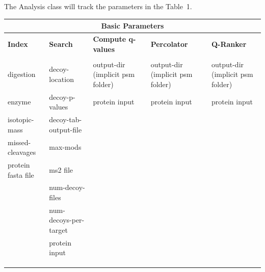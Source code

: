 \documentclass{article}
\begin{document}
The Analysis class will track the parameters in the Table~1.
\begin{table}[b]
\scriptsize
\begin{tabular}{lllll}
\hline
\multicolumn{5}{c}{Basic Parameters} \\
\hline
\textbf{Index}&\textbf{Search}&\textbf{Compute q-values}&\textbf{Percolator} &\textbf{Q-Ranker} \\
\hline \\
digestion            &decoy-location                    &output-dir (implicit psm folder) &output-dir (implicit psm folder) &output-dir (implicit psm folder) \\
enzyme               &decoy-p-values                    &protein input                    &protein input                    &protein input                    \\
isotopic-mass        &decoy-tab-output-file             &                                 &                                 &                                 \\
missed-cleavages     &max-mods                          &                                 &                                 &                                 \\
protein fasta file   &ms2 file                          &                                 &                                 &                                 \\
                     &num-decoy-files                   &                                 &                                 &                                 \\
                     &num-decoys-per-target             &                                 &                                 &                                 \\
                     &protein input                     &                                 &                                 &                                 \\
                     &                                  &                                 &                                 &                                 \\
                     &                                  &                                 &                                 &                                 \\
                     &                                  &                                 &                                 &                                 \\

\end{tabular}
\end{table}
\end{document}
